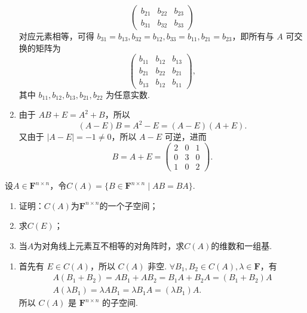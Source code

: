 \begin{exercise}
\begin{exgroup}
\begin{answer}
\begin{enumerate}
\[\begin{pmatrix}
                              b_{21} & b_{22} & b_{23} \\
                              b_{31} & b_{32} & b_{33}
                          \end{pmatrix} \]
                      对应元素相等，可得 $ b_{31} = b_{13}, b_{32} = b_{12}, b_{33} = b_{11}, b_{21} = b_{23} $，即所有与 $ A $ 可交换的矩阵为
                      \[ \begin{pmatrix}
                              b_{11} & b_{12} & b_{13} \\
                              b_{21} & b_{22} & b_{21} \\
                              b_{13} & b_{12} & b_{11}
                          \end{pmatrix}, \]
                      其中 $ b_{11}, b_{12}, b_{13}, b_{21}, b_{22} $ 为任意实数.

                \item 由于 $ AB + E = A^2 + B $，所以
                      \[ (A - E)B = A^2 - E = (A - E)(A + E). \]
                      又由于 $ |A - E| = -1 \neq 0 $，所以 $ A - E $ 可逆，进而
                      \[ B = A + E = \begin{pmatrix}
                              2 & 0 & 1 \\
                              0 & 3 & 0 \\
                              1 & 0 & 2
                          \end{pmatrix}. \]
            \end{enumerate}
        \end{answer}

        \item 设$A \in \mathbf{F}^{n \times n}$，令$C(A)=\{B \in \mathbf{F}^{n \times n} \mid AB=BA\}$.
        \begin{enumerate}
            \item 证明：$C(A)$为$\mathbf{F}^{n \times n}$的一个子空间；

            \item 求$C(E)$；

            \item 当$A$为对角线上元素互不相等的对角阵时，求$C(A)$的维数和一组基.
        \end{enumerate}
        \begin{answer}
            \begin{enumerate}
                \item 首先有 $ E \in C(A) $，所以 $ C(A) $ 非空. $ \forall B_1, B_2 \in C(A), \lambda \in \mathbf{F} $，有
                      \begin{gather*}
                          A(B_1 + B_2) = AB_1 + AB_2 = B_1A + B_2A = (B_1 + B_2)A \\
                          A(\lambda B_1) = \lambda AB_1 = \lambda B_1A = (\lambda B_1)A.
                      \end{gather*}
                      所以 $ C(A) $ 是 $ \mathbf{F}^{n \times n} $ 的子空间.


\end{enumerate}
\end{answer}
\end{exgroup}
\end{exercise}
